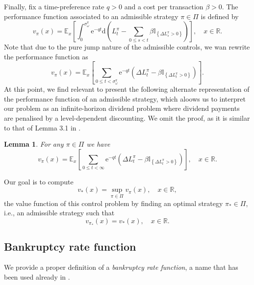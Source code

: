 \documentclass[11pt,reqno]{amsart}
\newtheorem{lemma}{Lemma}[section]
\newcommand{\e}{\mathbb{E}}
\newcommand{\reals}{\mathbb{R}}
\newcommand{\Ind}{\mathbb{I}}
\newcommand{\diff}{\mathrm{d}}
\newcommand{\ruintime}{\sigma^\pi_\omega}
\newcommand{\BRA}[1]{{{\left\{#1\right\}}}} %
\newcommand{\PAR}[1]{{{\left(#1\right)}}} %
\newcommand{\SBRA}[1]{{{\left[#1\right]}}} %
\renewcommand{\leq}{\leqslant}
\begin{document}
Finally, fix a time-preference rate $q > 0$ and a cost per transaction $\beta > 0$. The performance function associated to an admissible strategy $\pi \in \Pi$ is defined by
\[
v_\pi (x) = \e_x \left[ \int_0^{\ruintime} \mathrm{e}^{-q t} \diff \PAR{L^\pi_t - \sum_{0 \leq s < t}\beta \Ind_{\BRA{\Delta L^\pi_s > 0}} } \right] , \quad x \in \reals .
\]
Note that due to the pure jump nature of the admissible controls, we wan rewrite the performance function as
\[
v_\pi (x) = \e_x\SBRA{\sum_{0 \leq t < \ruintime} \mathrm{e}^{-q t} \PAR{\Delta L^\pi_t - \beta \Ind_{\BRA{\Delta L^\pi_t > 0}} } }.
\]
At this point, we find relevant to present the following alternate representation of the performance function of an admissible strategy, which aloows us to interpret our problem as an infinite-horizon dividend problem where dividend payments are penalised by a level-dependent discounting. We omit the proof, as it is similar to that of Lemma 3.1 in \cite{mata-renaud_2024}.
\begin{lemma}\label{lem:alternate}
	For any $\pi \in \Pi$ we have
	\[
	v_\pi(x) = \e_x\SBRA{ \sum_{0 \leq t < \infty} \mathrm{e}^{-q t} \PAR{\Delta L^\pi_t - \beta \Ind_{\BRA{\Delta L^\pi_t > 0}} }}, \quad x \in \reals.
	\]
\end{lemma}
Our goal is to compute
\begin{equation}\label{eq.Value}
v_\ast (x) = \sup_{\pi \in \Pi} v_\pi (x) , \quad x \in \reals ,
\end{equation}
the value function of this control problem by finding an optimal strategy $\pi_\ast \in \Pi$, i.e., an admissible strategy such that
\[
v_{\pi_\ast} (x) = v_\ast (x) , \quad x \in \reals .
\]


\subsection{Bankruptcy rate function}

We provide a proper definition of a \textit{bankruptcy rate function}, a name that has been used already in \cite{gerber-et-al_2012}.
\end{document}
